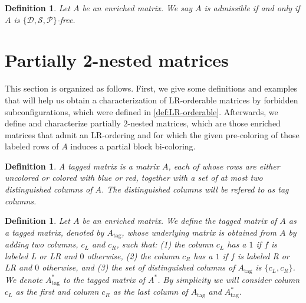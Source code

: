 \documentclass[12pt]{book}
\theoremstyle{plain}
\newtheorem{defn}[teo]{Definition}
\theoremstyle{remark}
\newcommand*{\tagg}{\mathrm{tag}}%
\begin{document}
\begin{defn} \label{teo:caract_admissible}
	Let $A$ be an enriched matrix. We say $A$ is \emph{admissible} if and only if $A$ is $ \{ \mathcal{D}, \mathcal{S}, \mathcal{P} \}$-free.
\end{defn}




\section{Partially 2-nested matrices} \label{section:part2nested}

This section is organized as follows. First, we give some definitions and examples that will help us obtain a characterization of LR-orderable matrices by forbidden subconfigurations, which were defined in \ref{def:LR-orderable}. 
Afterwards, we define and characterize partially $2$-nested matrices, which are those enriched matrices that admit an LR-ordering and for which the given pre-coloring of those labeled rows of $A$ induces a partial block bi-coloring.

\begin{defn}
A \emph{tagged matrix} is a matrix $A$, each of whose rows are either uncolored or colored with blue or red, together with a set of at most two distinguished columns of $A$. The distinguished columns will be refered to as \emph{tag columns}.
\end{defn}

\begin{defn}  \label{def:tagged_matrixA}
Let $A$ be an enriched matrix. We define the \emph{tagged matrix of $A$} as a tagged matrix, denoted by $A_\tagg$, whose underlying matrix is obtained from $A$ by adding two columns, $c_L$ and $c_R$, such that:
(1) the column $c_L$ has a $1$ if $f$ is labeled L or LR and $0$ otherwise, 
(2) the column $c_R$ has a $1$ if $f$ is labeled R or LR and $0$ otherwise, and 
(3) the set of distinguished columns of $A_{\tagg}$ is $\{ c_L, c_R\}$. 
We denote $A^*_\tagg$ to the tagged matrix of $A^*$. By simplicity we will consider column $c_L$ as the first and column $c_R$ as the last column of $A_\tagg$ and $A^*_\tagg$.
\end{defn}
\end{document}
